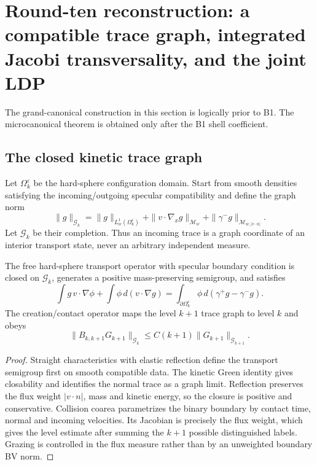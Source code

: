 \section{Round-ten reconstruction: a compatible trace graph, integrated Jacobi transversality, and the joint LDP}
\label{sec:r10-b2}

The grand-canonical construction in this section is logically prior to B1.
The microcanonical theorem is obtained only after the B1 shell coefficient.

\subsection{The closed kinetic trace graph}

Let \(\Omega_k^\varepsilon\) be the hard-sphere configuration domain.  Start
from smooth densities satisfying the incoming/outgoing specular compatibility
and define the graph norm
\[
 \|g\|_{\mathcal G_k}
 =\|g\|_{L^1_w(\Omega_k^\varepsilon)}
 +\|v\cdot\nabla_xg\|_{\mathcal M_w}
 +\|\gamma^-g\|_{\mathcal M_{w,|v\cdot n|}}.
\]
Let \(\mathcal G_k\) be their completion.  Thus an incoming trace is a graph
coordinate of an interior transport state, never an arbitrary independent
measure.

\begin{theorem}
\label{thm:r10-b2-trace}
The free hard-sphere transport operator with specular boundary condition is
closed on \(\mathcal G_k\), generates a positive mass-preserving semigroup,
and satisfies
\[
 \int g\,v\cdot\nabla\phi+
 \int\phi\,d(v\cdot\nabla g)
 =\int_{\partial\Omega_k^\varepsilon}
 \phi\,d(\gamma^+g-\gamma^-g).
\]
The creation/contact operator maps the level \(k+1\) trace graph to level
\(k\) and obeys
\[
 \|B_{k,k+1}G_{k+1}\|_{\mathcal G_k}
 \le C(k+1)\|G_{k+1}\|_{\mathcal G_{k+1}}.
\]
\end{theorem}

\begin{proof}
Straight characteristics with elastic reflection define the transport
semigroup first on smooth compatible data.  The kinetic Green identity gives
closability and identifies the normal trace as a graph limit.  Reflection
preserves the flux weight \(|v\cdot n|\), mass and kinetic energy, so the
closure is positive and conservative.  Collision coarea parametrizes the
binary boundary by contact time, normal and incoming velocities.  Its Jacobian
is precisely the flux weight, which gives the level estimate after summing the
\(k+1\) possible distinguished labels.  Grazing is controlled in the flux
measure rather than by an unweighted boundary BV norm.
\end{proof}

